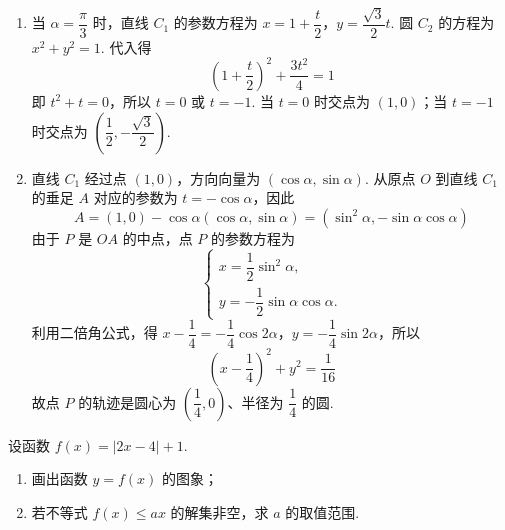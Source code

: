 \begin{solution}
\begin{enumerate}
\item 当 \(\alpha=\dfrac{\pi}{3}\) 时，直线 \(C_1\) 的参数方程为 \(x=1+\dfrac{t}{2}\)，\(y=\dfrac{\sqrt{3}}{2}t\). 圆 \(C_2\) 的方程为 \(x^2+y^2=1\). 代入得
\[
\left(1+\frac{t}{2}\right)^2+\frac{3t^2}{4}=1
\]
即 \(t^2+t=0\)，所以 \(t=0\) 或 \(t=-1\). 当 \(t=0\) 时交点为 \((1,0)\)；当 \(t=-1\) 时交点为 \(\left(\dfrac12,-\dfrac{\sqrt{3}}2\right)\).

\item 直线 \(C_1\) 经过点 \((1,0)\)，方向向量为 \((\cos\alpha,\sin\alpha)\). 从原点 \(O\) 到直线 \(C_1\) 的垂足 \(A\) 对应的参数为
\(t=-\cos\alpha\)，因此
\[
A=(1,0)-\cos\alpha(\cos\alpha,\sin\alpha)
=\left(\sin^2\alpha,-\sin\alpha\cos\alpha\right)
\]
由于 \(P\) 是 \(OA\) 的中点，点 \(P\) 的参数方程为
\[
\begin{cases}
x=\dfrac12\sin^2\alpha,\\
y=-\dfrac12\sin\alpha\cos\alpha.
\end{cases}
\]
利用二倍角公式，得 \(x-\dfrac14=-\dfrac14\cos2\alpha\)，\(y=-\dfrac14\sin2\alpha\)，所以
\[
\left(x-\frac14\right)^2+y^2=\frac1{16}
\]
故点 \(P\) 的轨迹是圆心为 \(\left(\dfrac14,0\right)\)、半径为 \(\dfrac14\) 的圆.
\end{enumerate}
\end{solution}

\begin{problem}
设函数 \( f(x) = |2x - 4| + 1 \).

\begin{enumerate}
\item 画出函数 \( y = f(x) \) 的图象；
\item 若不等式 \( f(x) \leqslant ax \) 的解集非空，求 \( a \) 的取值范围.
\end{enumerate}

\end{problem}


